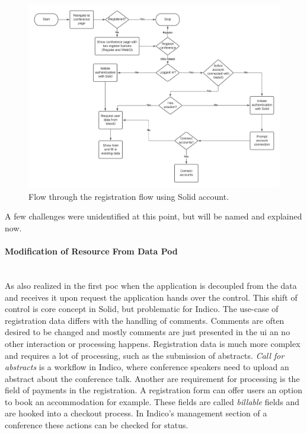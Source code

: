 \begin{figure}[H]
    \centering
    \includegraphics[width=1\textwidth]{prototype/graphs/poc-conference_registration_flow-sideways.jpeg}
    \caption{Flow through the registration flow using Solid account.}
    \label{fig:poc-conference_registration_flow-sideways}
\end{figure}

A few challenges were unidentified at this point, but will be named and explained now.
\vspace{0.5cm}
\paragraph{Modification of Resource From Data Pod}\mbox{}\\

As also realized in the first \gls{poc} when the application is decoupled from the data and receives it upon request the application hands over the control. This shift of control is core concept in Solid, but problematic for Indico. The use-case of registration data differs with the handling of comments. Comments are often desired to be changed and mostly comments are just presented in the \gls{ui} an no other interaction or processing happens. Registration data is much more complex and requires a lot of processing, such as the submission of abstracts. \textit{Call for abstracts} is a workflow in Indico, where conference speakers need to upload an abstract about the conference talk. Another are requirement for processing is the field of payments in the registration. A registration form can offer users an option to book an accommodation for example. These fields are called \textit{billable} fields and are hooked into a checkout process. In Indico's management section of a conference these actions can be checked for status.

